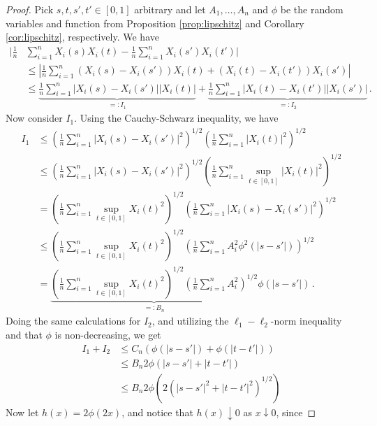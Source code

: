 \begin{proof}
    Pick $s, t, s', t' \in [0, 1]$ arbitrary and let $A_1, \dots, A_n$ and $\phi$ be the random
    variables and function from Proposition \ref{prop:lipschitz} and Corollary \ref{cor:lipschitz},
    respectively. We have
    \begin{align}
        |\frac{1}{n} &\sum_{i = 1}^n X_i(s) X_i(t) - \frac{1}{n} \sum_{i = 1}^n X_i(s') X_i(t')| \\
        &\leq |\frac{1}{n} \sum_{i = 1}^n (X_i(s) - X_i(s')) X_i(t) + (X_i(t) - X_i(t')) X_i(s')| \\
        &\leq \underbrace{\frac{1}{n} \sum_{i = 1}^n |X_i(s) - X_i(s')| |X_i(t)|}_{=:I_1} +
        \underbrace{\frac{1}{n} \sum_{i = 1}^n |X_i(t) - X_i(t')| |X_i(s')|}_{=:I_2} \,.
    \end{align}
    Now consider $I_1$. Using the Cauchy-Schwarz inequality, we have
    \begin{align}
        I_1 &\leq \left(\frac{1}{n} \sum_{i = 1}^n |X_i(s) - X_i(s')|^2\right)^{1/2}
        \left(\frac{1}{n} \sum_{i = 1}^n |X_i(t)|^2\right)^{1/2} \\
        &\leq \left(\frac{1}{n} \sum_{i = 1}^n |X_i(s) - X_i(s')|^2\right)^{1/2} \left(\frac{1}{n}
        \sum_{i = 1}^n \sup_{t \in [0, 1]} |X_i(t)|^2\right)^{1/2} \\
        &= \left(\frac{1}{n} \sum_{i = 1}^n \sup_{t \in [0, 1]} X_i(t)^2\right)^{1/2}
        \left(\frac{1}{n}\sum_{i = 1}^n |X_i(s) - X_i(s')|^2\right)^{1/2} \\
        &\leq \left(\frac{1}{n} \sum_{i = 1}^n \sup_{t \in [0, 1]} X_i(t)^2\right)^{1/2}
        \left(\frac{1}{n}\sum_{i = 1}^n A_i^2 \phi^2(|s - s'|)\right)^{1/2} \\
        &= \underbrace{\left(\frac{1}{n} \sum_{i = 1}^n \sup_{t \in [0, 1]} X_i(t)^2\right)^{1/2}
        \left(\frac{1}{n}\sum_{i = 1}^n A_i^2 \right)^{1/2}}_{=:B_n} \phi(|s - s'|) \,.
    \end{align}
    Doing the same calculations for $I_2$, and utilizing the $\ell_1-\ell_2$-norm inequality and
    that $\phi$ is non-decreasing, we get
    \begin{align}
        I_1 + I_2 &\leq C_n \left(\phi(|s - s'|) + \phi(|t - t'|)\right) \\
        &\leq B_n 2 \phi(|s - s'| + |t - t'|) \\
        &\leq B_n 2 \phi\left(2(|s - s'|^2 + |t - t'|^2)^{1/2}\right)
    \end{align}
    Now let $h(x) = 2 \phi(2 x)$, and notice that $h(x) \downarrow 0$ as $x \downarrow 0$, since

\end{proof}

